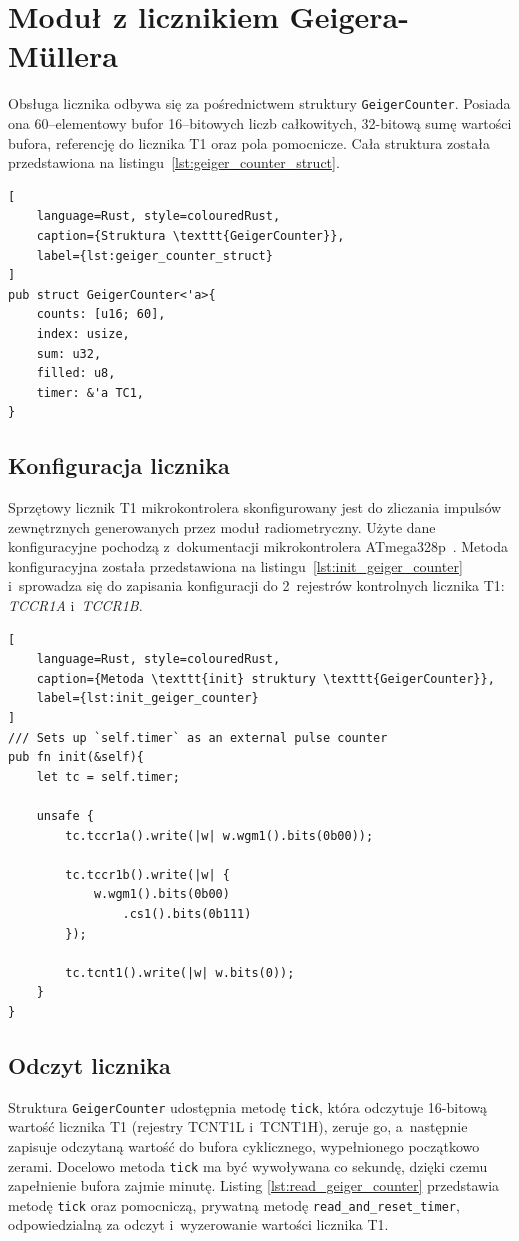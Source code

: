 \section{Moduł z licznikiem Geigera-Müllera}
\label{section:geiger_code}
Obsługa licznika odbywa się za pośrednictwem struktury \texttt{GeigerCounter}.
Posiada ona 60--elementowy bufor 16--bitowych liczb całkowitych,
32-bitową sumę wartości bufora, referencję do licznika T1 oraz pola pomocnicze.
Cała struktura została przedstawiona na listingu~\ref{lst:geiger_counter_struct}.

\begin{lstlisting}[
    language=Rust, style=colouredRust, 
    caption={Struktura \texttt{GeigerCounter}},
    label={lst:geiger_counter_struct}
]
pub struct GeigerCounter<'a>{
    counts: [u16; 60],
    index: usize,
    sum: u32,
    filled: u8,
    timer: &'a TC1,
}
\end{lstlisting}

\subsection*{Konfiguracja licznika}
Sprzętowy licznik T1 mikrokontrolera skonfigurowany jest do zliczania impulsów 
zewnętrznych generowanych przez moduł radiometryczny. Użyte dane konfiguracyjne
pochodzą z~dokumentacji mikrokontrolera ATmega328p~\cite{ATmega328p}.
Metoda konfiguracyjna została przedstawiona na listingu~\ref{lst:init_geiger_counter}
i~sprowadza się do zapisania konfiguracji do 2~rejestrów kontrolnych licznika
T1: \textit{TCCR1A} i~\textit{TCCR1B}.

\begin{lstlisting}[
    language=Rust, style=colouredRust, 
    caption={Metoda \texttt{init} struktury \texttt{GeigerCounter}},
    label={lst:init_geiger_counter}
]
/// Sets up `self.timer` as an external pulse counter
pub fn init(&self){
    let tc = self.timer;

    unsafe {
        tc.tccr1a().write(|w| w.wgm1().bits(0b00));

        tc.tccr1b().write(|w| {
            w.wgm1().bits(0b00)
                .cs1().bits(0b111)
        });

        tc.tcnt1().write(|w| w.bits(0));
    }
}
\end{lstlisting}

\subsection*{Odczyt licznika}
Struktura \texttt{GeigerCounter} udostępnia metodę \texttt{tick}, która 
odczytuje 16-bitową wartość licznika T1 (rejestry TCNT1L i~TCNT1H), 
zeruje go, a~następnie zapisuje odczytaną wartość do bufora cyklicznego, 
wypełnionego początkowo zerami.
Docelowo metoda \texttt{tick} ma być wywoływana co sekundę, dzięki czemu 
zapełnienie bufora zajmie minutę.
Listing \ref{lst:read_geiger_counter} przedstawia metodę \texttt{tick} 
oraz pomocniczą, prywatną metodę \texttt{read\_and\_reset\_timer}, 
odpowiedzialną za odczyt i~wyzerowanie wartości licznika T1.

